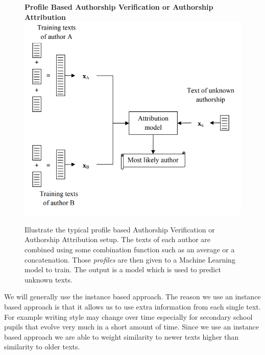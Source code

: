 \begin{figure}[htb]
    \centering
    \textbf{Profile Based Authorship Verification or Authorship Attribution}
    \includegraphics[scale=0.4]{./pictures/method/profile_based.png}
    \caption{Illustrate the typical profile based Authorship Verification or
        Authorship Attribution setup.\cite{stamatos2009} The texts of each
        author are combined using some combination function such as an average
        or a concatenation. Those \textit{profiles} are then given to a Machine
        Learning model to train. The output is a model which is used to predict
        unknown texts. }

    \label{fig:profile_based}
\end{figure}

We will generally use the instance based approach. The reason we use an instance
based approach is that it allows us to use extra information from each single
text. For example writing style may change over time especially for secondary
school pupils that evolve very much in a short amount of time. Since we use an
instance based approach we are able to weight similarity to newer texts higher
than similarity to older texts.

